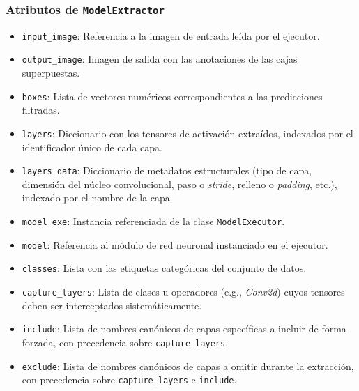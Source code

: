\subsubsection*{Atributos de \texttt{ModelExtractor}}
\begin{itemize}
    \item \texttt{input\_image}: Referencia a la imagen de entrada leída por el ejecutor.
    \item \texttt{output\_image}: Imagen de salida con las anotaciones de las cajas superpuestas.
    \item \texttt{boxes}: Lista de vectores numéricos correspondientes a las predicciones filtradas.
    \item \texttt{layers}: Diccionario con los tensores de activación extraídos, indexados por el identificador único de cada capa.
    \item \texttt{layers\_data}: Diccionario de metadatos estructurales (tipo de capa, dimensión del núcleo convolucional, paso o \textit{stride}, 
    relleno o \textit{padding}, etc.), indexado por el nombre de la capa.
    \item \texttt{model\_exe}: Instancia referenciada de la clase \texttt{ModelExecutor}.
    \item \texttt{model}: Referencia al módulo de red neuronal instanciado en el ejecutor.
    \item \texttt{classes}: Lista con las etiquetas categóricas del conjunto de datos.
    \item \texttt{capture\_layers}: Lista de clases u operadores (e.g., \textit{Conv2d}) cuyos tensores deben ser interceptados sistemáticamente.
    \item \texttt{include}: Lista de nombres canónicos de capas específicas a incluir de forma forzada, con precedencia sobre \texttt{capture\_layers}.
    \item \texttt{exclude}: Lista de nombres canónicos de capas a omitir durante la extracción, con precedencia sobre \texttt{capture\_layers} e \texttt{include}.
\end{itemize}

